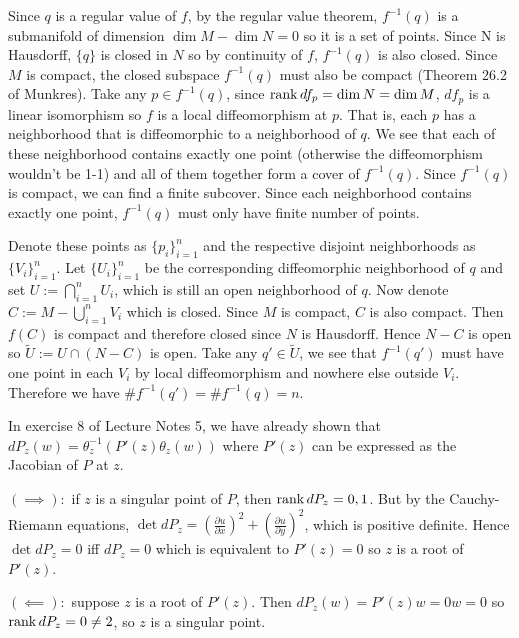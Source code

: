 \documentclass[12pt]{article}
\begin{document}
\begin{problem}[9.3]
Since $ q$ is a regular value of  $ f$,  by the regular value theorem, $ f^{-1}(q)$ is a submanifold of dimension $ \dim M - \dim N = 0$ so it is a set of points. Since N is Hausdorff, $ \{q\} $ is closed in $ N$ so by continuity of  $ f$,  $ f^{-1}(q)$ is also closed. Since $ M$ is compact, the closed subspace $ f^{-1}(q)$ must also be compact (Theorem 26.2 of Munkres). Take any $ p \in f^{-1}(q)$, since $ \operatorname{rank} df_p = \dim N = \dim M$, $ df_p$ is a linear isomorphism so  $ f$ is a local diffeomorphism at  $ p$. That is, each $ p$ has a neighborhood that is diffeomorphic to a neighborhood of $ q$. We see that each of these neighborhood contains exactly one point (otherwise the diffeomorphism wouldn't be 1-1) and all of them together form a cover of $ f^{-1}(q)$. Since $ f^{-1}(q)$ is compact, we can find a finite subcover. Since each neighborhood contains exactly one point, $ f^{-1}(q)$ must only have finite number of points.

Denote these points as $ \{p_i\}_{i=1}^{n} $ and the respective disjoint neighborhoods as $ \{V_i\}_{i=1}^{n}$. Let $ \{U_i\}_{i=1}^{n} $ be the corresponding diffeomorphic neighborhood of $ q$ and set $U:= \bigcap_{ i= 1}^{ n}  U_i$, which is still an open neighborhood of $ q$. Now denote $C := M - \bigcup_{ i= 1}^{ n} V_i$ which is closed. Since $ M$ is compact,  $ C$ is also compact. Then  $ f(C)$ is compact and therefore closed since  $ N$ is Hausdorff. Hence  $ N - C$ is open so  $ \widetilde{ U} := U \cap (N-C)$ is open. Take any $ q' \in \widetilde{ U}$, we see that $ f^{-1}(q')$ must have one point in each $ V_i$ by local diffeomorphism and nowhere else outside $ V_i$. Therefore we have $ \#f^{-1}(q') = \#f^{-1}(q) = n$.
\end{problem}

\begin{problem}[9.5]
In exercise 8 of Lecture Notes 5, we have already shown that  $ dP_z(w) = \theta_z ^{-1}(P'(z) \theta_z(w))$ where $ P'(z)$ can be expressed as the Jacobian of  $ P$ at  $ z$.

$ (\implies):$ if $ z$ is a singular point of  $ P$, then  $\operatorname{rank} dP_z=0,1$. But by the Cauchy-Riemann equations, $ \det dP_z = \left( \frac{\partial u}{ \partial x} \right)^2 + \left( \frac{ \partial u}{\partial y } \right)^2$, which is positive definite. Hence $ \det dP_z = 0$ iff  $ dP_z = 0$ which is equivalent to  $ P'(z) = 0$ so  $ z$ is a root of  $ P'(z)$.

$ (\impliedby):$ suppose $ z$ is a root of  $ P'(z)$. Then  $ dP_z(w) = P'(z)w = 0 w = 0$ so  $ \operatorname{rank} dP_z = 0 \neq 2$, so  $ z$ is a singular point.
\end{problem}
\end{document}
